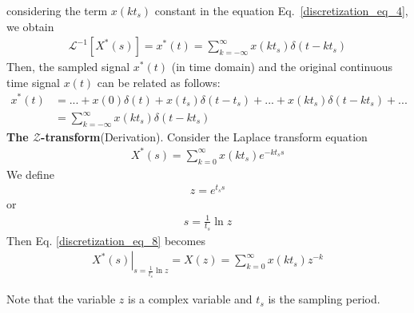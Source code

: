 \documentclass[12pt,a4paper,oneside]{book}
\begin{document}
\begin{onehalfspace}
\begin{mybox}
\begin{equation}
	\end{equation}
\end{mybox}
considering  the term $x(kt_s)$ constant in the equation 
Eq.~\ref{discretization_eq_4}, we obtain
\begin{equation}\label{discretization_eq_6}
	\begin{split}
		\mathcal{L}^{-1}\left[ X^*(s) \right] = x^*(t) = \sum_{k=-\infty}^{\infty}x(kt_s)\delta(t-kt_s)
	\end{split}
\end{equation}
Then,  the sampled signal $x^*(t)$ (in time domain) and the original continuous 
time signal $x(t)$ can be related as follows:
\begin{equation}\label{discretization_eq_7}
	\begin{split}
		x^*(t) &= ... + x(0)\delta(t)+x(t_s)\delta(t-t_s)+...+x(kt_s)\delta(t-kt_s)+...\\[6pt]
		&= \sum_{k=-\infty}^{\infty}x(kt_s)\delta(t-kt_s)
	\end{split}
\end{equation}
\noindent\textbf{The $\mathbf{\mathcal{Z}}$-transform}(Derivation). Consider 
the Laplace transform equation 
\begin{equation}\label{discretization_eq_8}
	\begin{split}
		X^*(s) = \sum_{k=0}^{\infty} x(kt_s)e^{-kt_ss} 
	\end{split}
\end{equation}
We define 
\begin{equation*}\label{discretization_eq_9}
	\begin{split}
		z=e^{t_ss} 
	\end{split}
\end{equation*}
or 
\begin{equation*}\label{discretization_eq_10}
	\begin{split}
		s=\frac{1}{t_s}\ln z 
	\end{split}
\end{equation*}
Then Eq. \ref{discretization_eq_8} becomes
\begin{equation}\label{discretization_eq_11}
	\begin{split}
		\left. X^*(s)\right|_{s=\frac{1}{t_s}\ln z }  = X(z) = 
		\sum_{k=0}^{\infty} x(kt_s)z^{-k} 
	\end{split}
\end{equation}

Note that the variable $z$ is a complex variable and $t_s$ is the sampling period. 


\end{onehalfspace}
\end{document}

